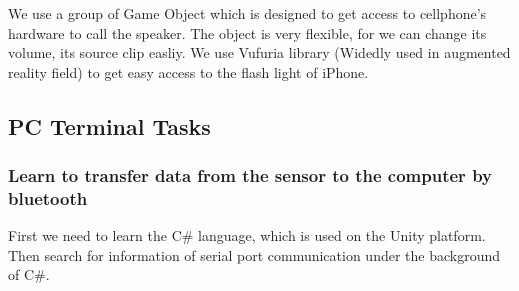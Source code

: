 We use a group of Game Object which is designed to get access to cellphone's
hardware to call the speaker.
The object is very flexible, for we can change its volume, its source clip
easliy. 
We use Vufuria library (Widedly used in augmented reality field) to get easy
access to the flash light of iPhone.

\subsection{PC Terminal Tasks}

\subsubsection{Learn to transfer data from the sensor to the computer by
  bluetooth} 

First we need to learn the C\# language, which is used on the Unity platform.
Then search for information of serial port communication under the background of
C\#. 

